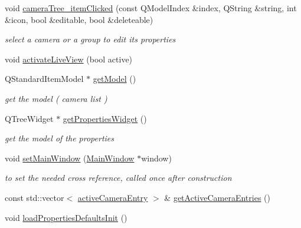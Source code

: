 \begin{DoxyCompactItemize}
void \mbox{\hyperlink{class_abstract_camera_manager_a10dee0f2e9a5efa1cf8b5775df66fb19}{camera\+Tree\+\_\+item\+Clicked}} (const Q\+Model\+Index \&index, Q\+String \&string, int \&icon, bool \&editable, bool \&deleteable)
\begin{DoxyCompactList}\small\item\em select a camera or a group to edit its properties \end{DoxyCompactList}\item 
void \mbox{\hyperlink{class_abstract_camera_manager_a01cbc0e517b10e8b1c087138307ab676}{activate\+Live\+View}} (bool active)
\item 
Q\+Standard\+Item\+Model $\ast$ \mbox{\hyperlink{class_abstract_camera_manager_a02097102061955f0092969a6cf812823}{get\+Model}} ()
\begin{DoxyCompactList}\small\item\em get the model ( camera list ) \end{DoxyCompactList}\item 
Q\+Tree\+Widget $\ast$ \mbox{\hyperlink{class_abstract_camera_manager_a8cfcc9f2156936f1d8faea55ad97eeab}{get\+Properties\+Widget}} ()
\begin{DoxyCompactList}\small\item\em get the model of the properties \end{DoxyCompactList}\item 
void \mbox{\hyperlink{class_abstract_camera_manager_a9369df77518a91e24596d2bbe3436bab}{set\+Main\+Window}} (\mbox{\hyperlink{class_main_window}{Main\+Window}} $\ast$window)
\begin{DoxyCompactList}\small\item\em to set the needed cross reference, called once after construction \end{DoxyCompactList}\item 
const std\+::vector$<$ \mbox{\hyperlink{struct_abstract_camera_manager_1_1active_camera_entry}{active\+Camera\+Entry}} $>$ \& \mbox{\hyperlink{class_abstract_camera_manager_aff485288660c144b5c269c10ef4c8782}{get\+Active\+Camera\+Entries}} ()
\item 
void \mbox{\hyperlink{class_abstract_camera_manager_a8de0c6eb036295d3bcf6d25c95ed4da2}{load\+Properties\+Defaults\+Init}} ()
\end{DoxyCompactItemize}
